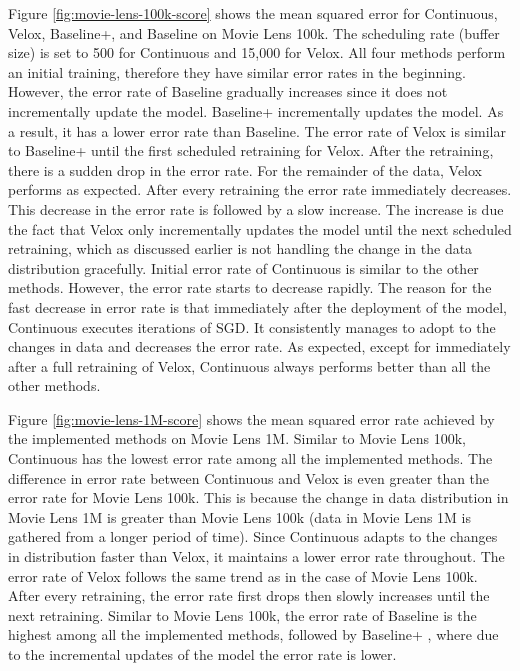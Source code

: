 \documentclass{vldb}
\begin{document}
Figure \ref{fig:movie-lens-100k-score} shows the mean squared error for Continuous, Velox, Baseline+, and Baseline on Movie Lens 100k.
The scheduling rate (buffer size) is set to 500 for Continuous and 15,000 for Velox.
All four methods perform an initial training, therefore they have similar error rates in the beginning.
However, the error rate of Baseline gradually increases since it does not incrementally update the model.
Baseline+ incrementally updates the model.
As a result, it has a lower error rate than Baseline.
The error rate of Velox is similar to Baseline+ until the first scheduled retraining for Velox.
After the retraining, there is a sudden drop in the error rate.
For the remainder of the data, Velox performs as expected.
After every retraining the error rate immediately decreases.
This decrease in the error rate is followed by a slow increase.
The increase is due the fact that Velox only incrementally updates the model until the next scheduled retraining, which as discussed earlier is not handling the change in the data distribution gracefully.
Initial error rate of Continuous is similar to the other methods.
However, the error rate starts to decrease rapidly.
The reason for the fast decrease in error rate is that immediately after the deployment of the model, Continuous executes iterations of SGD.
It consistently manages to adopt to the changes in data and decreases the error rate.
As expected, except for immediately after a full retraining of Velox, Continuous always performs better than all the other methods.

Figure \ref{fig:movie-lens-1M-score} shows the mean squared error rate achieved by the implemented methods on Movie Lens 1M.
Similar to Movie Lens 100k, Continuous has the lowest error rate among all the implemented methods.
The difference in error rate between Continuous and Velox is even greater than the error rate for Movie Lens 100k.
This is because the change in data distribution in Movie Lens 1M is greater than Movie Lens 100k (data in Movie Lens 1M is gathered from a longer period of time).
Since Continuous adapts to the changes in distribution faster than Velox, it maintains a lower error rate throughout.
The error rate of Velox follows the same trend as in the case of Movie Lens 100k. 
After every retraining, the error rate first drops then slowly increases until the next retraining.
Similar to Movie Lens 100k, the error rate of Baseline is the highest among all the implemented methods, followed by Baseline+ , where due to the incremental updates of the model the error rate is lower.
\end{document}
